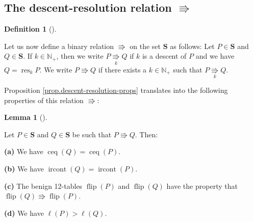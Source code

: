 \documentclass[numbers=enddot,12pt,final,onecolumn,notitlepage]{scrartcl}%
\theoremstyle{definition}
\newtheorem{lem}[theo]{Lemma}
\newenvironment{lemma}[1][]
{\begin{lem}[#1]\begin{leftbar}}
{\end{leftbar}\end{lem}}
\newtheorem{defi}[theo]{Definition}
\newenvironment{definition}[1][]
{\begin{defi}[#1]\begin{leftbar}}
{\end{leftbar}\end{defi}}
\begin{document}

\subsection{The descent-resolution relation $\Rrightarrow$}

\begin{definition}
Let us now define a binary relation $\Rrightarrow$ on the set $\mathbf{S}$ as
follows: Let $P\in\mathbf{S}$ and $Q\in\mathbf{S}$. If $k\in\mathbb{N}_{+}$,
then we write $P\underset{k}{\Rrightarrow}Q$ if $k$ is a descent
of $P$ and we have $Q=\operatorname*{res}\nolimits_{k}P$. We write $P\Rrightarrow Q$ if there
exists a $k\in\mathbb{N}_{+}$ such that $P\underset{k}{\Rrightarrow}Q$.
\end{definition}

Proposition \ref{prop.descent-resolution-props} translates into the following properties of this relation
$\Rrightarrow$:

\begin{lemma}
\label{lem.descent-resolution-props}Let $P\in\mathbf{S}$ and $Q\in\mathbf{S}$
be such that $P\Rrightarrow Q$. Then:

\textbf{(a)} We have $\operatorname*{ceq}\left(  Q\right)
=\operatorname*{ceq}\left(  P\right)  $.

\textbf{(b)} We have $\operatorname*{ircont}\left(  Q\right)
=\operatorname*{ircont}\left(  P\right)  $.

\textbf{(c)} The benign 12-tables $\operatorname*{flip}\left(  P\right)  $ and
$\operatorname*{flip}\left(  Q\right)  $ have the property that
$\operatorname*{flip}\left(  Q\right)  \Rrightarrow\operatorname*{flip}\left(
P\right)  $.

\textbf{(d)} We have $\ell\left(  P\right)  >\ell\left(  Q\right)  $.
\end{lemma}
\end{document}
